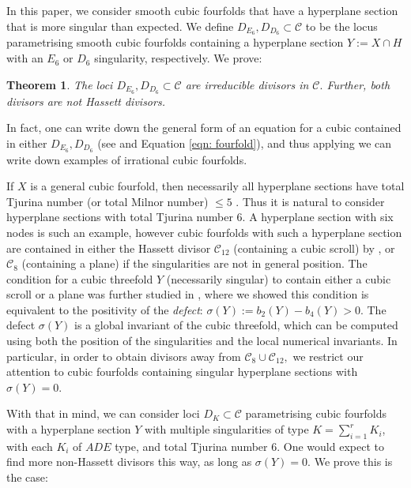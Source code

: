 \documentclass[12pt]{amsart}
\numberwithin{equation}{section}
\theoremstyle{plain}
\newtheorem{theorem}[equation]{Theorem}
\theoremstyle{remark}
\theoremstyle{definition}
\newcommand{\calC}{\mathcal{C}}
\begin{document}
In this paper, we consider smooth cubic fourfolds that have a hyperplane section that is more singular than expected. We define $D_{E_6}, D_{D_6}\subset \calC$ to be the locus parametrising smooth cubic fourfolds containing a hyperplane section $Y:=X\cap H$ with an $E_6$ or $D_6$ singularity, respectively. We prove:

\begin{theorem}\label{Main theorem}
    The loci $D_{E_6}, D_{D_6}\subset \calC$ are irreducible divisors in $\calC.$ Further, both divisors are not Hassett divisors.
\end{theorem}
In fact, one can write down the general form of an equation for a cubic contained in either $D_{E_6}, D_{D_6}$ (see  and Equation \ref{eqn: fourfold}), and thus applying \cite{KKPY} we can write down examples of irrational cubic fourfolds.

If $X$ is a general cubic fourfold, then necessarily all hyperplane sections have total Tjurina number (or total Milnor number) $\leq 5$ \cite[Lemma 3.8]{LSV}. 
Thus it is natural to consider hyperplane sections with total Tjurina number 6. 
A hyperplane section with six nodes is such an example, however cubic fourfolds with such a hyperplane section are contained in either the Hassett divisor $\calC_{12}$ (containing a cubic scroll) by \cite{flops}, or $\calC_{8}$ (containing a plane) if the singularities are not in general position. 
The condition for a cubic threefold $Y$ (necessarily singular) to contain either a cubic scroll or a plane was further studied in \cite{MV25}, where we showed this condition is equivalent to the positivity of the \textit{defect}: $\sigma(Y):=b_2(Y)-b_4(Y)>0$. 
The defect $\sigma(Y)$ is a global invariant of the cubic threefold, which can be computed using both the position of the singularities and the local numerical invariants. 
In particular, in order to obtain divisors away from $\calC_8\cup \calC_{12},$ we restrict our attention to cubic fourfolds containing singular hyperplane sections with $\sigma(Y)=0.$

With that in mind, we can consider loci $D_K\subset \calC$ parametrising cubic fourfolds with a hyperplane section $Y$ with multiple singularities of type $K=\sum_{i=1}^rK_i$, with each $K_i$ of $ADE$ type, and total Tjurina number 6. 
One would expect to find more non-Hassett divisors this way, as long as $\sigma(Y)=0$. 
We prove this is the case:
\end{document}
